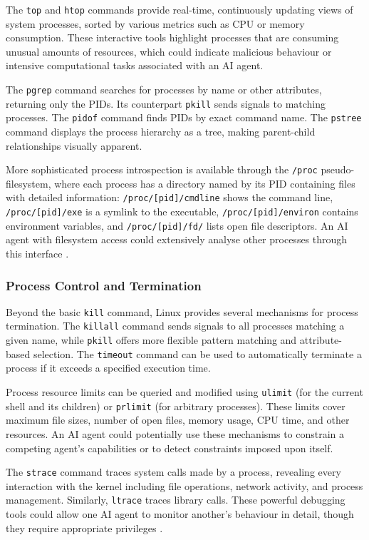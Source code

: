 The \texttt{top} and \texttt{htop} commands provide real-time, continuously updating views of system processes, sorted by various metrics such as CPU or memory consumption. These interactive tools highlight processes that are consuming unusual amounts of resources, which could indicate malicious behaviour or intensive computational tasks associated with an AI agent.

The \texttt{pgrep} command searches for processes by name or other attributes, returning only the PIDs. Its counterpart \texttt{pkill} sends signals to matching processes. The \texttt{pidof} command finds PIDs by exact command name. The \texttt{pstree} command displays the process hierarchy as a tree, making parent-child relationships visually apparent.

More sophisticated process introspection is available through the \texttt{/proc} pseudo-filesystem, where each process has a directory named by its PID containing files with detailed information: \texttt{/proc/[pid]/cmdline} shows the command line, \texttt{/proc/[pid]/exe} is a symlink to the executable, \texttt{/proc/[pid]/environ} contains environment variables, and \texttt{/proc/[pid]/fd/} lists open file descriptors. An AI agent with filesystem access could extensively analyse other processes through this interface \parencite{LinuxManPages}.

\subsubsection{Process Control and Termination}
\label{ProcessControlTermination}

Beyond the basic \texttt{kill} command, Linux provides several mechanisms for process termination. The \texttt{killall} command sends signals to all processes matching a given name, while \texttt{pkill} offers more flexible pattern matching and attribute-based selection. The \texttt{timeout} command can be used to automatically terminate a process if it exceeds a specified execution time.

Process resource limits can be queried and modified using \texttt{ulimit} (for the current shell and its children) or \texttt{prlimit} (for arbitrary processes). These limits cover maximum file sizes, number of open files, memory usage, CPU time, and other resources. An AI agent could potentially use these mechanisms to constrain a competing agent's capabilities or to detect constraints imposed upon itself.

The \texttt{strace} command traces system calls made by a process, revealing every interaction with the kernel including file operations, network activity, and process management. Similarly, \texttt{ltrace} traces library calls. These powerful debugging tools could allow one AI agent to monitor another's behaviour in detail, though they require appropriate privileges \parencite{LinuxManPages}.

